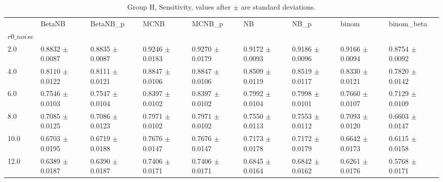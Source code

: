 \begin{table}[H]
\centering
\begin{adjustbox}{max width=\linewidth}
\begin{tabular}{lllllllll}
\toprule
 & BetaNB & BetaNB\_p & MCNB & MCNB\_p & NB & NB\_p & binom & binom\_beta \\
$r0\_noise$ &  &  &  &  &  &  &  &  \\
\midrule
2.0 & 0.8832 $\pm$ 0.0087 & 0.8835 $\pm$ 0.0087 & 0.9246 $\pm$ 0.0183 & 0.9270 $\pm$ 0.0179 & 0.9172 $\pm$ 0.0093 & 0.9186 $\pm$ 0.0096 & 0.9166 $\pm$ 0.0094 & 0.8754 $\pm$ 0.0092 \\
4.0 & 0.8110 $\pm$ 0.0122 & 0.8111 $\pm$ 0.0121 & 0.8847 $\pm$ 0.0106 & 0.8847 $\pm$ 0.0106 & 0.8509 $\pm$ 0.0119 & 0.8519 $\pm$ 0.0117 & 0.8330 $\pm$ 0.0121 & 0.7820 $\pm$ 0.0142 \\
6.0 & 0.7546 $\pm$ 0.0103 & 0.7547 $\pm$ 0.0104 & 0.8397 $\pm$ 0.0102 & 0.8397 $\pm$ 0.0102 & 0.7992 $\pm$ 0.0104 & 0.7998 $\pm$ 0.0101 & 0.7660 $\pm$ 0.0107 & 0.7129 $\pm$ 0.0109 \\
8.0 & 0.7085 $\pm$ 0.0125 & 0.7086 $\pm$ 0.0123 & 0.7971 $\pm$ 0.0102 & 0.7971 $\pm$ 0.0102 & 0.7550 $\pm$ 0.0113 & 0.7553 $\pm$ 0.0112 & 0.7093 $\pm$ 0.0120 & 0.6603 $\pm$ 0.0147 \\
10.0 & 0.6703 $\pm$ 0.0195 & 0.6719 $\pm$ 0.0188 & 0.7676 $\pm$ 0.0147 & 0.7676 $\pm$ 0.0147 & 0.7173 $\pm$ 0.0178 & 0.7172 $\pm$ 0.0179 & 0.6642 $\pm$ 0.0173 & 0.6115 $\pm$ 0.0158 \\
12.0 & 0.6389 $\pm$ 0.0187 & 0.6390 $\pm$ 0.0187 & 0.7406 $\pm$ 0.0171 & 0.7406 $\pm$ 0.0171 & 0.6845 $\pm$ 0.0164 & 0.6842 $\pm$ 0.0162 & 0.6261 $\pm$ 0.0176 & 0.5768 $\pm$ 0.0171 \\
\bottomrule
\end{tabular}

\end{adjustbox}
\caption{Group H, Sensitivity, values after $\pm$ are standard deviations.}
\end{table}

